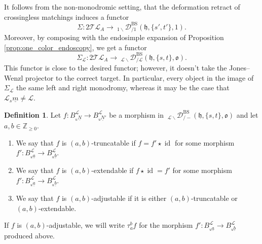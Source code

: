 \documentclass{amsart}
\newcommand{\Z}{\mathbb{Z}}
\newcommand{\scrL}{\mathcal{L}}
\DeclareMathOperator{\id}{id}
\newcommand{\fr}[1]{\mathfrak{#1}}
\DeclareMathOperator{\BS}{BS}
\newcommand{\TLcat}{2\mathcal{T}\mathcal{L}}
\newcommand{\EWmon}[2]{\:_{#1 \backslash} \mathcal{D}_{/ #2} }
\theoremstyle{definition}
\newtheorem{definition}[subsubsection]{Definition}
\numberwithin{equation}{subsection}
\begin{document}
It follows from the non-monodromic setting, that the deformation retract of crossingless matchings induces a functor
\[ \Sigma : \TLcat_A \to \EWmon{1}{1}^{\BS} (\fr{h}, \{s',t'\},  1).\]
Moreover, by composing with the endosimple expansion of Proposition \ref{prop:one_color_endoscopy}, we get a functor
\[\Sigma_{\scrL} :  \TLcat_A \to \EWmon{\scrL}{\scrL}^{\BS} (\fr{h}, \{s,t\}, \fr{o}).\]
This functor is close to the desired functor; however, it doesn't take the Jones--Wenzl projector to the correct target.
In particular, every object in the image of $\Sigma_{\scrL}$ the same left and right monodromy, whereas it may be the case that $\scrL {}_s \underline{m} \neq \scrL$.

\begin{definition}
    Let $f : B_{{}_u \underline{N}}^{\scrL} \to B_{{}_u \underline{N}'}^{\scrL}$ be a morphism in $\EWmon{\scrL}{-}^{\BS} (\fr{h}, \{s,t\}, \fr{o})$ and let $a,b \in \Z_{\geq 0}$.
    \begin{enumerate}
        \item We say that $f$ is $(a,b)$-truncatable if $f = f' \star \id$ for some morphism $f' : B_{{}_u \underline{a}}^{\scrL} \to B_{{}_u \underline{b}}^{\scrL}$.
        \item We say that $f$ is $(a,b)$-extendable if $f \star \id = f'$ for some morphism $f' : B_{{}_u \underline{a}}^{\scrL} \to B_{{}_u \underline{b}}^{\scrL}$.
        \item We say that $f$ is $(a,b)$-adjustable if it is either $(a,b)$-truncatable or $(a,b)$-extendable.
    \end{enumerate}
    If $f$ is $(a,b)$-adjustable, we will write $\tau_a^b f$ for the morphism $f' : B_{{}_u \underline{a}}^{\scrL} \to B_{{}_u \underline{b}}^{\scrL}$ produced above. 
\end{definition}
\end{document}
